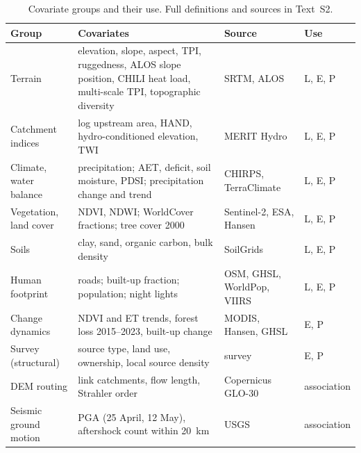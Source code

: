 \documentclass[preprint,12pt,authoryear]{elsarticle}
\begin{document}
\begin{table}[!htbp]
  \centering
  \caption{Covariate groups and their use. Full definitions and sources in Text~S2.}
  \label{tab:covariates}
  \small
  \begin{tabularx}{\linewidth}{>{\raggedright\arraybackslash}p{2.6cm}X>{\raggedright\arraybackslash}p{2.6cm}l}
    \toprule
    Group & Covariates & Source & Use \\
    \midrule
    Terrain & elevation, slope, aspect, TPI, ruggedness, ALOS slope position, CHILI heat load, multi-scale TPI, topographic diversity & SRTM, ALOS & L, E, P \\
    Catchment indices & log upstream area, HAND, hydro-conditioned elevation, TWI & MERIT Hydro & L, E, P \\
    Climate, water balance & precipitation; AET, deficit, soil moisture, PDSI; precipitation change and trend & CHIRPS, TerraClimate & L, E, P \\
    Vegetation, land cover & NDVI, NDWI; WorldCover fractions; tree cover 2000 & Sentinel-2, ESA, Hansen & L, E, P \\
    Soils & clay, sand, organic carbon, bulk density & SoilGrids & L, E, P \\
    Human footprint & roads; built-up fraction; population; night lights & OSM, GHSL, WorldPop, VIIRS & L, E, P \\
    Change dynamics & NDVI and ET trends, forest loss 2015--2023, built-up change & MODIS, Hansen, GHSL & E, P \\
    Survey (structural) & source type, land use, ownership, local source density & survey & E, P \\
    \midrule
    DEM routing & link catchments, flow length, Strahler order & Copernicus GLO-30 & association \\
    Seismic ground motion & PGA (25 April, 12 May), aftershock count within \SI{20}{\kilo\metre} & USGS & association \\
    \bottomrule
  \end{tabularx}
  \par{}
\end{table}
\end{document}

